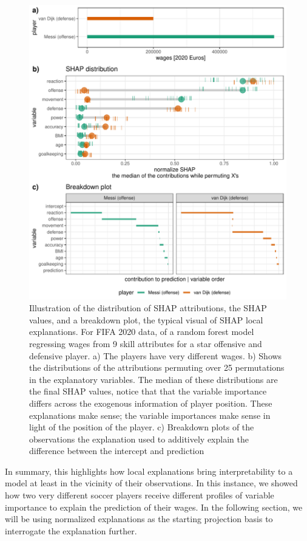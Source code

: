 \documentclass[
]{article}
\begin{document}
\begin{figure}

{\centering \includegraphics{./figures/shap_distr_bd} 

}

\caption{Illustration of the distribution of SHAP attributions, the SHAP values, and a breakdown plot, the typical visual of SHAP local explanations. For FIFA 2020 data, of a random forest model regressing wages from 9 skill attributes for a star offensive and defensive player. a) The players have very different wages. b) Shows the distributions of the attributions permuting over 25 permutations in the explanatory variables. The median of these distributions are the final SHAP values, notice that that the variable importance differs across the exogenous information of player position. These explanations make sense; the variable importances make sense in light of the position of the player. c) Breakdown plots of the observations the explanation used to additively explain the difference between the intercept and prediction}\label{fig:shapdistrbd}
\end{figure}

In summary, this highlights how local explanations bring interpretability to a model at least in the vicinity of their observations. In this instance, we showed how two very different soccer players receive different profiles of variable importance to explain the prediction of their wages. In the following section, we will be using normalized explanations as the starting projection basis to interrogate the explanation further.
\end{document}
